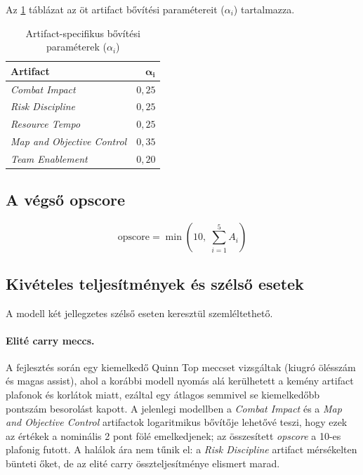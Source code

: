 Az \ref{tab:overflow_params} táblázat az öt artifact bővítési paramétereit (\(\alpha_i\)) tartalmazza.

\begin{table}[H]
\centering
\caption{Artifact-specifikus bővítési paraméterek ($\alpha_i$)}
\label{tab:overflow_params}
\begin{tabular}{|l|r|}
\hline
\textbf{Artifact} & $\boldsymbol{\alpha_i}$ \\
\hline
\textit{Combat Impact}             & $0{,}25$ \\
\textit{Risk Discipline}           & $0{,}25$ \\
\textit{Resource Tempo}            & $0{,}25$ \\
\textit{Map and Objective Control} & $0{,}35$ \\
\textit{Team Enablement}           & $0{,}20$ \\
\hline
\end{tabular}
\end{table}

\subsection{A végső opscore}

\begin{equation}
\text{opscore} = \min\!\left(10,\; \sum_{i=1}^{5} A_i\right)
\end{equation}

\subsection{Kivételes teljesítmények és szélső esetek}

A modell két jellegzetes szélső eseten keresztül szemléltethető.

\paragraph{Elité carry meccs.}
A fejlesztés során egy kiemelkedő Quinn Top meccset vizsgáltak (kiugró ölésszám és magas assist), ahol a korábbi modell nyomás alá kerülhetett a kemény artifact plafonok és korlátok miatt, ezáltal egy átlagos semmivel se kiemelkedőbb pontszám besorolást kapott. A jelenlegi modellben a \textit{Combat Impact} és a \textit{Map and Objective Control} artifactok logaritmikus bővítője lehetővé teszi, hogy ezek az értékek a nominális 2 pont fölé emelkedjenek; az összesített \textit{opscore} a 10-es plafonig futott. A halálok ára nem tűnik el: a \textit{Risk Discipline} artifact mérsékelten bünteti őket, de az elité carry összteljesítménye elismert marad.

